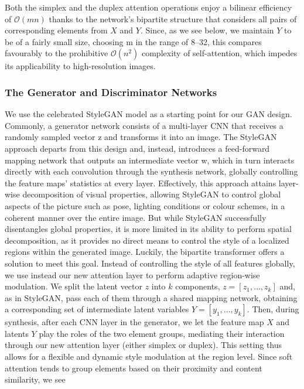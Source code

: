 \documentclass{article}
\begin{document}
	Both the simplex and the duplex attention operations enjoy a bilinear efficiency of 
	$\mathcal{O}(mn)$ thanks to the network’s bipartite structure that considers all pairs of 
	corresponding elements from $X$ and $Y$. Since, as we see below, we maintain $Y$ to be of a fairly 
	small size, choosing m in the range of 8–32, this compares favourably to the prohibitive 	
	$\mathcal{O}(n^2)$  complexity of self-attention, which impedes its applicability to high-resolution 
	images.
	
	\subsubsection{The Generator and Discriminator Networks}
	We use the celebrated StyleGAN model as a starting point for our GAN design. Commonly, a 
	generator network consists of a multi-layer CNN that receives a randomly sampled vector z and 
	transforms it into an image. The StyleGAN approach departs from this design and, instead, 
	introduces a feed-forward mapping network that outputs an intermediate vector w, which in turn 
	interacts directly with each convolution through the synthesis network, globally controlling the 
	feature maps’ statistics at every layer.
	Effectively, this approach attains layer-wise decomposition of visual properties, allowing StyleGAN 
	to control global aspects of the picture such as pose, lighting conditions or colour schemes, in a 
	coherent manner over the entire image. But while StyleGAN successfully disentangles global 
	properties, it is more limited in its ability to perform spatial decomposition, as it provides no direct 
	means to control the style of a localized regions within the generated image.
	Luckily, the bipartite transformer offers a solution to meet this goal. Instead of controlling the style 
	of all features globally, we use instead our new attention layer to perform adaptive region-wise 
	modulation. We split the latent vector $z$ into $k$ components, $z = [z_1 ,  
	\dots, z_k ]$ and, as in StyleGAN, pass each of them through a shared mapping network, obtaining 
	a corresponding set of intermediate latent variables $Y = [y_1 , ..., y_k ]$. Then, during synthesis, 
	after each CNN layer in the generator, we let the feature map $X$ and latents $Y$ play the roles of 
	the two element groups, mediating their interaction through our new attention layer (either simplex 
	or duplex). This setting thus allows for a flexible and dynamic style modulation at the region level. 
	Since soft attention tends to group elements based on their proximity and content similarity, we see 
\end{document}
